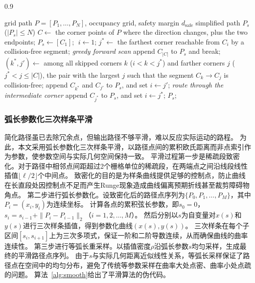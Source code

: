 \documentclass[lettersize,journal]{IEEEtran}
\begin{document}
\begin{algorithm}[!t]
\caption{Safety-distance-aware path simplification}
\label{alg:simplify}
\begin{spacing}{0.9}
\begin{algorithmic}[1]
\REQUIRE grid path $P = [P_1, \ldots, P_N]$, occupancy grid, safety margin $d_{\mathrm{safe}}$
\ENSURE simplified path $P_s$ ($|P_s| \leq N$)
\STATE $C \gets$ the corner points of $P$ where the direction changes, plus the two endpoints;
\STATE $P_s \gets [C_1]$; $\; i \gets 1$;
\STATE $j^{*} \gets$ the farthest corner reachable from $C_i$ by a collision-free segment; \quad\textit{greedy forward scan}
\STATE append $C_{|C|}$ to $P_s$ and break;
\ENDIF
\STATE $(k^{*}, j') \gets$ among all skipped corners $k$ ($i < k < j^{*}$) and farther corners $j$ ($j^{*} < j \leq |C|$), the pair with the largest $j$ such that the segment $C_k \to C_j$ is collision-free;
\STATE append $C_{k^{*}}$ and $C_{j'}$ to $P_s$, and set $i \gets j'$; \quad\textit{route through the intermediate corner}
\ELSE
\STATE append $C_{j^{*}}$ to $P_s$, and set $i \gets j^{*}$;
\ENDIF
\ENDWHILE
\RETURN $P_s$;
\end{algorithmic}
\end{spacing}
\end{algorithm}
\subsubsection{弧长参数化三次样条平滑}

简化路径虽已去除冗余点，但输出路径不够平滑，难以反应实际运动的路程。
为此，本文采用弧长参数化三次样条平滑，以路径点间的累积欧氏距离而非点索引作为参数，使参数空间与实际几何空间保持一致。
平滑过程第一步是稀疏段致密化。对于路径中相邻点间距超过2个栅格单位的稀疏段，在两端点之间沿线段线性插值$\lfloor \ell / 2 \rfloor$个中间点。
致密化的目的是为样条曲线提供足够的控制点，防止曲线在长直段处因控制点不足而产生Runge现象造成曲线偏离预期折线甚至裁剪障碍物角点。
第二步进行弧长参数化。设致密化后的路径点序列为$\{P_0, P_1, \ldots, P_M\}$，其中$P_i = (x_i, y_i)$为连续坐标。
计算各点的累积弦长参数，即$s_0 = 0$，$s_i = s_{i-1} + \|P_i - P_{i-1}\|_2$（$i = 1, 2, \ldots, M$）。
然后分别以$s$为自变量对$x(s)$和$y(s)$进行三次样条插值，得到参数化曲线$(x(s), y(s))$。
三次样条在每个子区间$[s_i, s_{i+1}]$上为三次多项式，保证一阶和二阶导数连续，从而确保曲线的曲率连续性。
第三步进行等弧长重采样。以插值密度$\rho$沿弧长参数$s$均匀采样，生成最终的平滑路径点序列。
由于$s$与实际几何距离近似线性关系，等弧长采样保证了路径点在空间中的均匀分布，避免了传统等参数采样在曲率大处点密、曲率小处点疏的问题。
算法~\textcolor{blue}{\ref{alg:smooth}}给出了平滑算法的伪代码。
\end{document}
